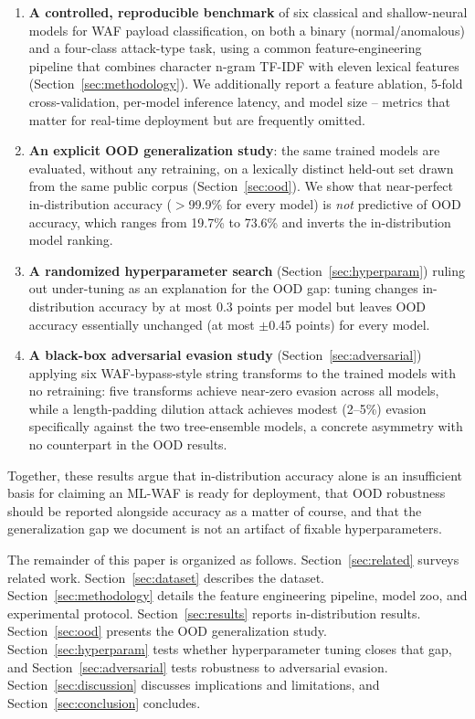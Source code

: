 \documentclass{article}
\begin{document}
\begin{enumerate}
\item \textbf{A controlled, reproducible benchmark} of six classical and
  shallow-neural models for WAF payload classification, on both a binary
  (normal/anomalous) and a four-class attack-type task, using a common
  feature-engineering pipeline that combines character n-gram TF-IDF with
  eleven lexical features (Section~\ref{sec:methodology}). We additionally
  report a feature ablation, 5-fold cross-validation, per-model inference
  latency, and model size -- metrics that matter for real-time deployment but
  are frequently omitted.
\item \textbf{An explicit OOD generalization study}: the same trained models
  are evaluated, without any retraining, on a lexically distinct held-out set
  drawn from the same public corpus (Section~\ref{sec:ood}). We show that
  near-perfect in-distribution accuracy ($>$99.9\% for every model) is
  \emph{not} predictive of OOD accuracy, which ranges from 19.7\% to 73.6\%
  and inverts the in-distribution model ranking.
\item \textbf{A randomized hyperparameter search} (Section~\ref{sec:hyperparam})
  ruling out under-tuning as an explanation for the OOD gap: tuning changes
  in-distribution accuracy by at most 0.3 points per model but leaves OOD
  accuracy essentially unchanged (at most $\pm$0.45 points) for every model.
\item \textbf{A black-box adversarial evasion study} (Section~\ref{sec:adversarial})
  applying six WAF-bypass-style string transforms to the trained models
  with no retraining: five transforms achieve near-zero evasion across all
  models, while a length-padding dilution attack achieves modest (2--5\%)
  evasion specifically against the two tree-ensemble models, a concrete
  asymmetry with no counterpart in the OOD results.
\end{enumerate}

Together, these results argue that in-distribution accuracy alone is an
insufficient basis for claiming an ML-WAF is ready for deployment, that OOD
robustness should be reported alongside accuracy as a matter of course, and
that the generalization gap we document is not an artifact of fixable
hyperparameters.

The remainder of this paper is organized as follows. Section~\ref{sec:related}
surveys related work. Section~\ref{sec:dataset} describes the dataset.
Section~\ref{sec:methodology} details the feature engineering pipeline, model
zoo, and experimental protocol. Section~\ref{sec:results} reports
in-distribution results. Section~\ref{sec:ood} presents the OOD generalization
study. Section~\ref{sec:hyperparam} tests whether hyperparameter tuning closes
that gap, and Section~\ref{sec:adversarial} tests robustness to adversarial
evasion. Section~\ref{sec:discussion} discusses implications and limitations,
and Section~\ref{sec:conclusion} concludes.
\end{document}
